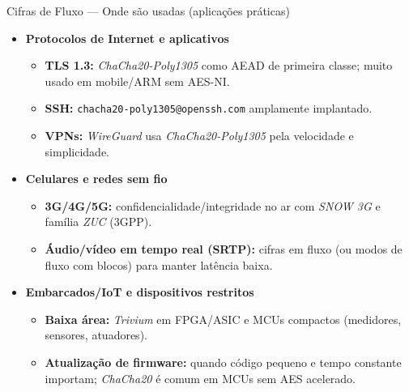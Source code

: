\documentclass{beamer}
\begin{document}
\begin{frame}{Cifras de Fluxo — Onde são usadas (aplicações práticas)}
\small
\begin{itemize}
  \item \textbf{Protocolos de Internet e aplicativos}
    \begin{itemize}
        \footnotesize
        \item \textbf{TLS 1.3:} \textit{ChaCha20-Poly1305} como AEAD de primeira classe; muito usado em mobile/ARM sem AES-NI.
        \item \textbf{SSH:} \texttt{chacha20-poly1305@openssh.com} amplamente implantado.
        \item \textbf{VPNs:} \textit{WireGuard} usa \textit{ChaCha20-Poly1305} pela velocidade e simplicidade.
    \end{itemize}
    \small
    \item \textbf{Celulares e redes sem fio}
        \begin{itemize}
        \footnotesize
          \item \textbf{3G/4G/5G:} confidencialidade/integridade no ar com \textit{SNOW 3G} e família \textit{ZUC} (3GPP).
          \item \textbf{Áudio/vídeo em tempo real (SRTP):} cifras em fluxo (ou modos de fluxo com blocos) para manter latência baixa.
        \end{itemize}
    \small
    \item \textbf{Embarcados/IoT e dispositivos restritos}
        \begin{itemize}
            \footnotesize
            \item \textbf{Baixa área:} \textit{Trivium} em FPGA/ASIC e MCUs compactos (medidores, sensores, atuadores).
            \item \textbf{Atualização de firmware:} quando código pequeno e tempo constante importam; \textit{ChaCha20} é comum em MCUs sem AES acelerado.
        \end{itemize}
\end{itemize}
\end{frame}
\end{document}
